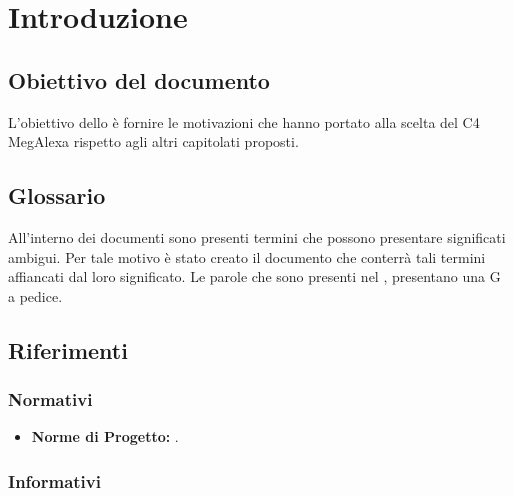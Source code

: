 \justify \section{Introduzione}

\subsection{Obiettivo del documento}
L’obiettivo dello \docNameVersionSdF\doc{} è fornire le motivazioni che hanno portato alla scelta del  C4 MegAlexa rispetto agli altri capitolati proposti.

\subsection{Glossario}
All’interno dei documenti sono presenti termini che possono presentare significati ambigui. Per tale motivo è stato creato il documento  \docNameGlo{} \docVersionGlo\doc{} che conterrà tali termini affiancati dal loro significato. Le parole che sono presenti nel \docNameGlo{} \docVersionGlo{}, presentano una G a pedice.

\subsection{Riferimenti}

\subsubsection{Normativi}

\begin{itemize}
\item \textbf{Norme di Progetto:} \docNameVersionNdP\doc{}\mbox{}.
\end{itemize}

\subsubsection{Informativi}

